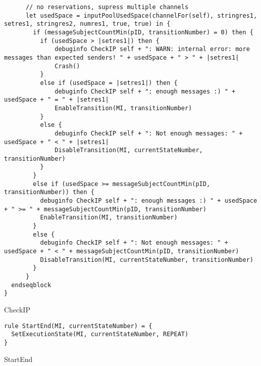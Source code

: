 \begin{listing}[H]
\begin{verbatim}
      // no reservations, supress multiple channels
      let usedSpace = inputPoolUsedSpace(channelFor(self), stringres1, setres1, stringres2, numres1, true, true) in {
        if (messageSubjectCountMin(pID, transitionNumber) = 0) then {
          if (usedSpace > |setres1|) then {
              debuginfo CheckIP self + ": WARN: internal error: more messages than expected senders! " + usedSpace + " > " + |setres1|
              Crash()
          }
          else if (usedSpace = |setres1|) then {
              debuginfo CheckIP self + ": enough messages :) " + usedSpace + " = " + |setres1|
              EnableTransition(MI, transitionNumber)
          }
          else {
              debuginfo CheckIP self + ": Not enough messages: " + usedSpace + " < " + |setres1|
              DisableTransition(MI, currentStateNumber, transitionNumber)
          }
        }
        else if (usedSpace >= messageSubjectCountMin(pID, transitionNumber)) then {
          debuginfo CheckIP self + ": enough messages :) " + usedSpace + " >= " + messageSubjectCountMin(pID, transitionNumber)
          EnableTransition(MI, transitionNumber)
        }
        else {
          debuginfo CheckIP self + ": Not enough messages: " + usedSpace + " < " + messageSubjectCountMin(pID, transitionNumber)
          DisableTransition(MI, currentStateNumber, transitionNumber)
        }
      }
  endseqblock
}
\end{verbatim}
\caption{CheckIP}
\label{lst:asm:CheckIP}
\end{listing}





\begin{listing}[H]
\begin{verbatim}
rule StartEnd(MI, currentStateNumber) = {
  SetExecutionState(MI, currentStateNumber, REPEAT)
}
\end{verbatim}
\caption{StartEnd}
\label{lst:asm:StartEnd}
\end{listing}




